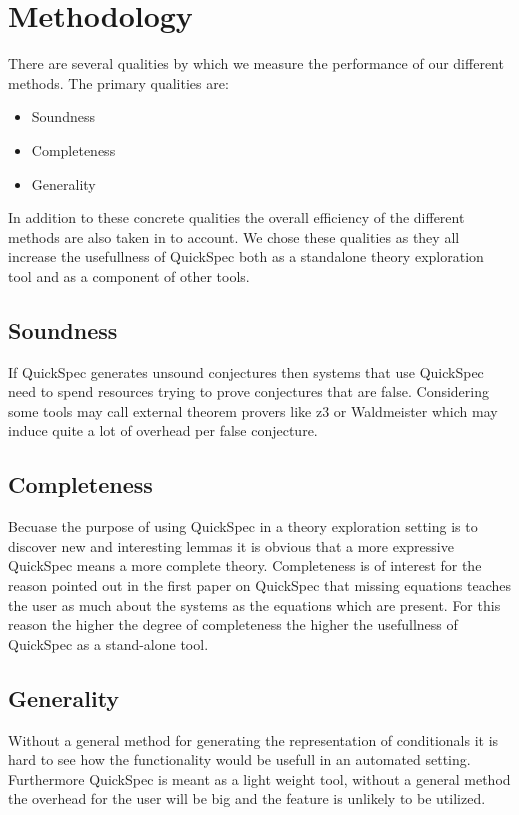 \section{Methodology}
There are several qualities by which we measure the performance of our different methods.
The primary qualities are:

\begin{itemize}

    \item Soundness
    \item Completeness
    \item Generality

\end{itemize}

In addition to these concrete qualities the overall efficiency of the different methods are also
taken in to account.
We chose these qualities as they all increase the usefullness
of QuickSpec both as a standalone theory exploration tool
and as a component of other tools.

    \subsection{Soundness}
    If QuickSpec generates unsound conjectures then systems that use QuickSpec
    need to spend resources trying to prove conjectures that are false. 
    Considering some tools may call external theorem provers like z3 or Waldmeister %
    which may induce quite a lot of overhead per false conjecture.

    \subsection{Completeness}
    Becuase the purpose of using QuickSpec in a theory exploration setting is to discover
    new and interesting lemmas it is obvious that a more expressive QuickSpec means a more
    complete theory. %
    Completeness is of interest for the reason pointed out in the first paper on QuickSpec that %
    missing equations teaches the user as much about the systems as the equations which are
    present. For this reason the higher the degree of completeness the higher the usefullness
    of QuickSpec as a stand-alone tool. 

    \subsection{Generality}
    Without a general method for generating the representation of conditionals
    it is hard to see how the functionality would be usefull in an automated setting.
    Furthermore QuickSpec is meant as a light weight tool, without a general method
    the overhead for the user will be big and the feature is unlikely to be utilized.
